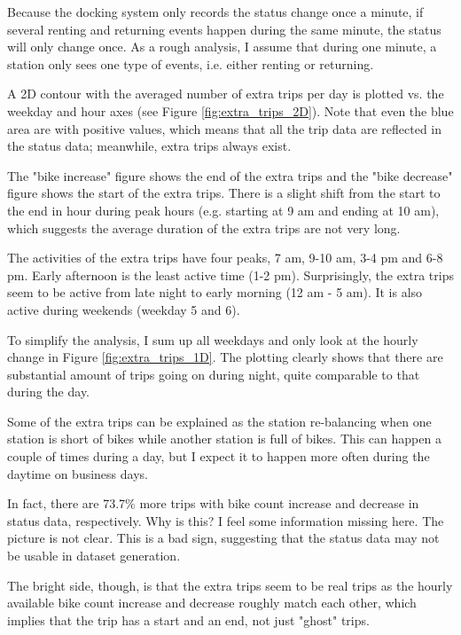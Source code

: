 \documentclass[a4paper]{article}
\begin{document}
			Because the docking system only records the status change once a minute, if several renting and returning events happen during the same minute, the status will only change once. As a rough analysis, I assume that during one minute, a station only sees one type of events, i.e. either renting or returning.
			
			A 2D contour with the averaged number of extra trips per day is plotted vs. the weekday and hour axes (see Figure \ref{fig:extra_trips_2D}). Note that even the blue area are with positive values, which means that all the trip data are reflected in the status data; meanwhile, extra trips always exist. 
			
			The "bike increase" figure shows the end of the extra trips and the "bike decrease" figure shows the start of the extra trips. There is a slight shift from the start to the end in hour during peak hours (e.g. starting at 9 am and ending at 10 am), which suggests the average duration of the extra trips are not very long. 
			
			The activities of the extra trips have four peaks, 7 am, 9-10 am, 3-4 pm and 6-8 pm. Early afternoon is the least active time (1-2 pm). Surprisingly, the extra trips seem to be active from late night to early morning (12 am - 5 am). It is also active during weekends (weekday 5 and 6).
			
			To simplify the analysis, I sum up all weekdays and only look at the hourly change in Figure \ref{fig:extra_trips_1D}. The plotting clearly shows that there are substantial amount of trips going on during night, quite comparable to that during the day.
			
			Some of the extra trips can be explained as the station re-balancing when one station is short of bikes while another station is full of bikes. This can happen a couple of times during a day, but I expect it to happen more often during the daytime on business days.
					
			In fact, there are 73.7\% more trips with bike count increase and decrease in status data, respectively. Why is this? I feel some information missing here. The picture is not clear. This is a bad sign, suggesting that the status data may not be usable in dataset generation. 
			
			The bright side, though, is that the extra trips seem to be real trips as the hourly available bike count increase and decrease roughly match each other, which implies that the trip has a start and an end, not just "ghost" trips.
			
\end{document}
